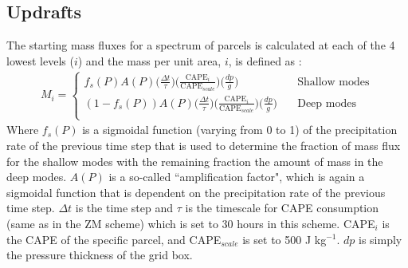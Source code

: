 \documentclass[letterpaper,12pt,titlepage,oneside,final]{book}
\begin{document}
\subsection{Updrafts}
The starting mass fluxes for a spectrum of parcels is calculated at each of the 4 lowest levels ($i$) and the mass per unit area, $i$, is defined as \citep{folkins_simple_2014}:
\begin{align}\label{eq:zmm}
M_{i} = 
     \begin{cases}
       f_{s}(P)A(P)\big(\frac{\Delta{t}}{\tau}\big)\big(\frac{\text{CAPE}_{i}}{\text{CAPE}_{scale}}\big)\big(\frac{dp}{g}\big) &\quad\text{Shallow modes}\\
      (1-f_{s}(P))A(P)\big(\frac{\Delta{t}}{\tau}\big)\big(\frac{\text{CAPE}_{i}}{\text{CAPE}_{scale}}\big)\big(\frac{dp}{g}\big) &\quad\text{Deep modes}\\
     \end{cases}
\end{align}
Where $f_{s}(P)$ is a sigmoidal function (varying from 0 to 1) of the precipitation rate of the previous time step that is used to determine the fraction of mass flux for the shallow modes with the remaining fraction the amount of mass in the deep modes. $A(P)$ is a so-called ``amplification factor", which is again a sigmoidal function that is dependent on the precipitation rate of the previous time step. $\Delta{t}$ is the time step and $\tau$ is the timescale for CAPE consumption (same as in the ZM scheme) which is set to 30 hours in this scheme. CAPE$_{i}$ is the CAPE of the specific parcel, and CAPE$_{scale}$ is set to 500 J kg$^{-1}$. $dp$ is simply the pressure thickness of the grid box.
\end{document}
